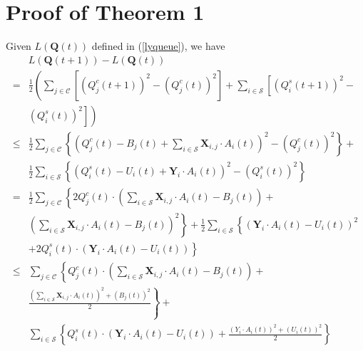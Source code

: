 \documentclass[10pt,journal,compsoc]{IEEEtran}
\begin{document}
\section{Proof of Theorem 1}
Given $L(\mathbf{Q}(t))$ defined in (\ref{lyqueue}), we have 
\begin{equation}\label{lyap-diff}
	\begin{array}{cl}
		& L(\mathbf{Q}(t+1)) - L(\mathbf{Q}(t)) \\
		= & \displaystyle \frac{1}{2} \left( \sum_{j \in \mathcal{C}} \left[ \left(Q^c_j(t+1)\right)^2 - \left(Q^c_j(t)\right)^2 \right] + \sum_{i \in \mathcal{S}} \left[ \left(Q^s_i(t+1)\right)^2 - \right. \right. \\
		& \displaystyle \left. \left. \left(Q^s_i(t)\right)^2 \right] \right) \\
		\le & \displaystyle \frac{1}{2} \sum_{j \in \mathcal{C}} \left\{ \left( Q^c_j(t) - B_j(t) + \sum_{i \in \mathcal{S}} \mathbf{X}_{i,j} \cdot {A}_{i}(t) \right)^2 - \left(Q^c_j(t)\right)^2 \right\} + \\
		& \displaystyle \frac{1}{2} \sum_{i \in \mathcal{S}} \left\{ \left( Q^s_i(t) - U_i(t) + \mathbf{Y}_i \cdot {A}_{i}(t) \right)^2 - \left(Q^s_i(t)\right)^2 \right\} \\
		= & \displaystyle \frac{1}{2} \sum_{j \in \mathcal{C}} \left\{ 2Q^c_j(t) \cdot \left( \sum_{i \in \mathcal{S}} \mathbf{X}_{i,j}\cdot {A}_{i}(t) - B_j(t) \right) + \right. \\
		& \displaystyle \left. \left( \sum_{i \in \mathcal{S}} \mathbf{X}_{i,j} \cdot {A}_{i}(t) - B_j(t) \right)^2 \right\} + 
		\frac{1}{2} \sum_{i \in \mathcal{S}} \displaystyle \left\{ \left( \mathbf{Y}_i \cdot {A}_{i}(t) - U_i(t) \right)^2 \right. \\
		& \displaystyle \left. + 2Q^s_i(t) \cdot \left( \mathbf{Y}_i \cdot {A}_{i}(t) - U_i(t) \right) \right\}
		\\
		\le & \displaystyle \sum_{j \in \mathcal{C}} \left\{ Q^c_j(t) \cdot \left( \sum_{i \in \mathcal{S}} \mathbf{X}_{i,j} \cdot {A}_{i}(t) - B_j(t) \right) + \right. \\
		& \displaystyle \left. \frac{ (\sum_{i \in \mathcal{S}} \mathbf{X}_{i,j}\cdot {A}_{i}(t))^2 + (B_j(t))^2}{2} \right\} + \\
		& \displaystyle \sum_{i \in \mathcal{S}} \left\{ Q^s_i(t) \cdot \left( \mathbf{Y}_{i} \cdot {A}_{i}(t) - U_i(t) \right) +
		\frac{ (Y_i \cdot {A}_{i}(t))^2 + (U_i(t))^2}{2} \right\} \\
	\end{array}	
\end{equation}
\end{document}
